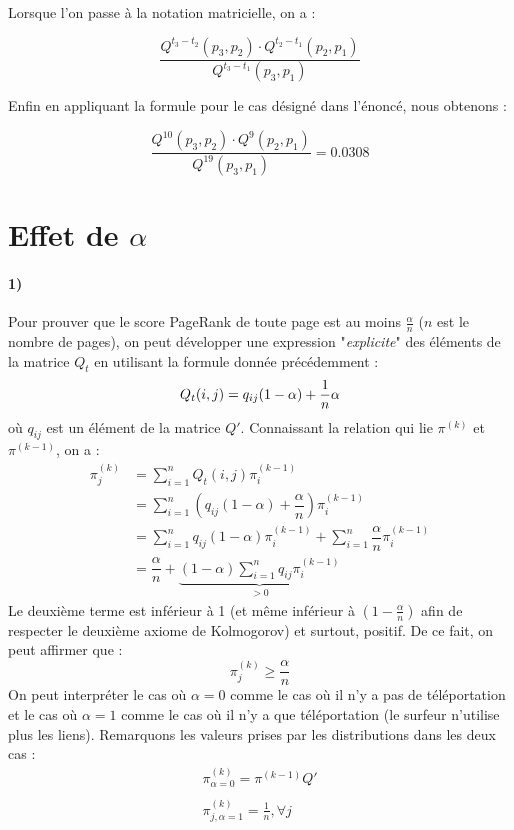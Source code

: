 \documentclass[a4paper,titlepage]{report}
\begin{document}
Lorsque l'on passe à la notation matricielle, on a :

$$\dfrac{Q^{t_3 - t_2}(p_3, p_2) \cdot Q^{t_2 - t_1}(p_2, p_1)}{Q^{t_3 - t_1}(p_3, p_1)}
$$

Enfin en appliquant la formule pour le cas désigné dans l'énoncé, nous obtenons :

$$\dfrac{Q^{10}(p_3, p_2) \cdot Q^{9}(p_2, p_1)}{Q^{19}(p_3, p_1)} = 0.0308
$$

\section{Effet de $\alpha$}
\label{sec:effet_alpha}
\paragraph{1)}
Pour prouver que le score PageRank de toute page est au moins $\frac{\alpha}{n}$ ($n$ est le nombre de pages), on peut développer une expression "\textit{explicite}" des éléments de la matrice $Q_t$ en utilisant la formule donnée précédemment : 
\[
Q_t(i,j) = q_{ij} (1 - \alpha) + \dfrac{1}{n}\alpha\\
\]
où $q_{ij}$ est un élément de la matrice $Q'$. Connaissant la relation qui lie $\pi^{(k)}$ et $\pi^{(k-1)}$, on a :
\[
\begin{aligned}
\pi^{(k)}_j &= \sum\limits_{i = 1}^n Q_t(i,j)\pi^{(k-1)}_i\\
 &= \sum\limits_{i = 1}^n \left(q_{ij} (1 - \alpha) + \dfrac{\alpha}{n}\right)\pi^{(k-1)}_i\\
 &= \sum\limits_{i = 1}^n q_{ij} (1 - \alpha) \pi^{(k-1)}_i + \sum\limits_{i = 1}^n \dfrac{\alpha}{n} \pi^{(k-1)}_i\\
 &= \dfrac{\alpha}{n} + \underbrace{(1 - \alpha) \sum\limits_{i = 1}^n q_{ij} \pi^{(k-1)}_i}_{> 0}
\end{aligned}
\]
Le deuxième terme est inférieur à 1 (et même inférieur à $(1 - \frac{\alpha}{n})$ afin de respecter le deuxième axiome de Kolmogorov) et surtout, positif. De ce fait, on peut affirmer que :
\[
\pi^{(k)}_j \geq \dfrac{\alpha}{n}
\]
On peut interpréter le cas où $\alpha = 0$ comme le cas où il n'y a pas de téléportation et le cas où $\alpha = 1$ comme le cas où il n'y a que téléportation (le surfeur n'utilise plus les liens). Remarquons les valeurs prises par les distributions dans les deux cas :
\[
\begin{array}{l}
\pi_{\alpha = 0}^{(k)} = \pi^{(k-1)} Q'\\ \\
\pi_{j,\alpha = 1}^{(k)} = \frac{1}{n}, \forall j
\end{array}
\]
\end{document}
